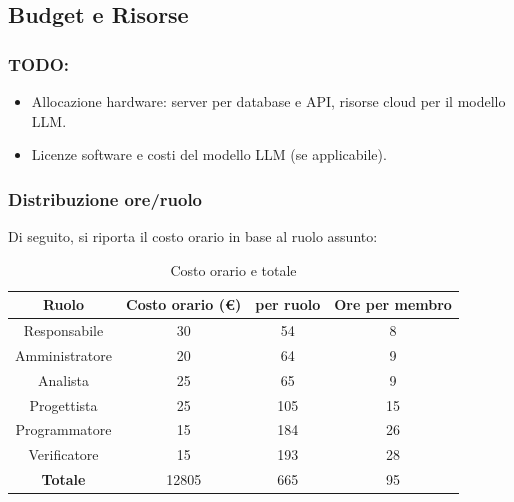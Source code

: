 \documentclass{article}
\begin{document}
    \subsection{Budget e Risorse}
        \subsubsection{TODO: }
        \begin{itemize}
            \item Allocazione hardware: server per database e API, risorse cloud per il modello LLM.
            \item Licenze software e costi del modello LLM (se applicabile).
        \end{itemize}
        \subsubsection{Distribuzione ore/ruolo}
        Di seguito, si riporta il costo orario in base al ruolo assunto:
        \begin{table}[!h]
            \begin{center}
                \begin{tabular}{ |c|c|c|c| }
                    \hline
                    \textbf{Ruolo}          & \textbf{Costo orario} (\euro) &  \textbf{per ruolo}   & \textbf{Ore per membro} \\
                    \hline          
                    Responsabile   & 30           &     54       &       8        \\
                    Amministratore & 20           &     64       &       9        \\
                    Analista       & 25           &     65       &       9       \\
                    Progettista    & 25           &     105      &       15       \\
                    Programmatore  & 15           &     184      &       26       \\
                    Verificatore   & 15           &     193      &       28       \\
                    \hline
                    \textbf{Totale}         &    12805    &     665       &       95       \\
                    \hline
                \end{tabular}
                \caption{Costo orario e totale}
            \end{center}
        \end{table}
\end{document}
